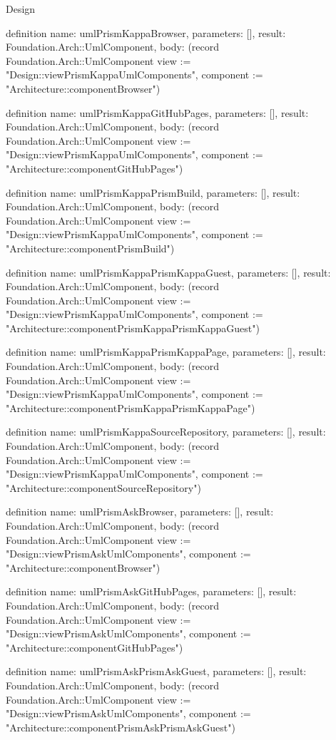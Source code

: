 \begin{lexlean}{Design}
\begin{semanticmodule}
definition{
  name: umlPrismKappaBrowser,
  parameters: [],
  result: Foundation.Arch::UmlComponent,
  body: (record Foundation.Arch::UmlComponent {view := "Design::viewPrismKappaUmlComponents", component := "Architecture::componentBrowser"})
}

definition{
  name: umlPrismKappaGitHubPages,
  parameters: [],
  result: Foundation.Arch::UmlComponent,
  body: (record Foundation.Arch::UmlComponent {view := "Design::viewPrismKappaUmlComponents", component := "Architecture::componentGitHubPages"})
}

definition{
  name: umlPrismKappaPrismBuild,
  parameters: [],
  result: Foundation.Arch::UmlComponent,
  body: (record Foundation.Arch::UmlComponent {view := "Design::viewPrismKappaUmlComponents", component := "Architecture::componentPrismBuild"})
}

definition{
  name: umlPrismKappaPrismKappaGuest,
  parameters: [],
  result: Foundation.Arch::UmlComponent,
  body: (record Foundation.Arch::UmlComponent {view := "Design::viewPrismKappaUmlComponents", component := "Architecture::componentPrismKappaPrismKappaGuest"})
}

definition{
  name: umlPrismKappaPrismKappaPage,
  parameters: [],
  result: Foundation.Arch::UmlComponent,
  body: (record Foundation.Arch::UmlComponent {view := "Design::viewPrismKappaUmlComponents", component := "Architecture::componentPrismKappaPrismKappaPage"})
}

definition{
  name: umlPrismKappaSourceRepository,
  parameters: [],
  result: Foundation.Arch::UmlComponent,
  body: (record Foundation.Arch::UmlComponent {view := "Design::viewPrismKappaUmlComponents", component := "Architecture::componentSourceRepository"})
}

definition{
  name: umlPrismAskBrowser,
  parameters: [],
  result: Foundation.Arch::UmlComponent,
  body: (record Foundation.Arch::UmlComponent {view := "Design::viewPrismAskUmlComponents", component := "Architecture::componentBrowser"})
}

definition{
  name: umlPrismAskGitHubPages,
  parameters: [],
  result: Foundation.Arch::UmlComponent,
  body: (record Foundation.Arch::UmlComponent {view := "Design::viewPrismAskUmlComponents", component := "Architecture::componentGitHubPages"})
}

definition{
  name: umlPrismAskPrismAskGuest,
  parameters: [],
  result: Foundation.Arch::UmlComponent,
  body: (record Foundation.Arch::UmlComponent {view := "Design::viewPrismAskUmlComponents", component := "Architecture::componentPrismAskPrismAskGuest"})
}


\end{semanticmodule}
\end{lexlean}

